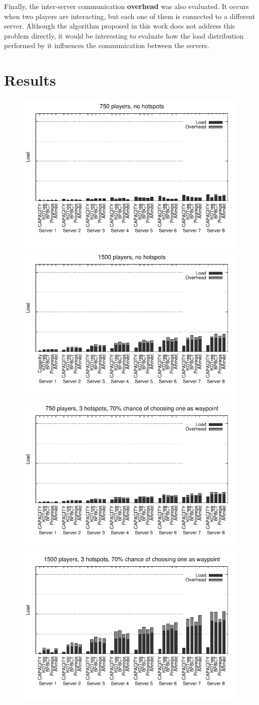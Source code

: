 \documentclass[acmjacm]{acmtrans2m}
\begin{document}
Finally, the inter-server communication \textbf{overhead} was also evaluated. It occurs when two players are interacting, but each one of them is connected to a different server. Although the algorithm proposed in this work does not address this problem directly, it would be interesting to evaluate how the load distribution performed by it influences the communication between the servers.

\section{Results}
\label{sec:result}

\begin{figure}[!t]
	\centering
	\includegraphics[width=0.495\linewidth]{data/750players_prob0/distribution_750_0}
	\includegraphics[width=0.495\linewidth]{data/1500players_prob0/distribution_1500_0}
	\includegraphics[width=0.495\linewidth]{data/750players_prob70/distribution_750_70}
	\includegraphics[width=0.495\linewidth]{data/1500players_prob70/distribution_1500_70}

\end{figure}
\end{document}
